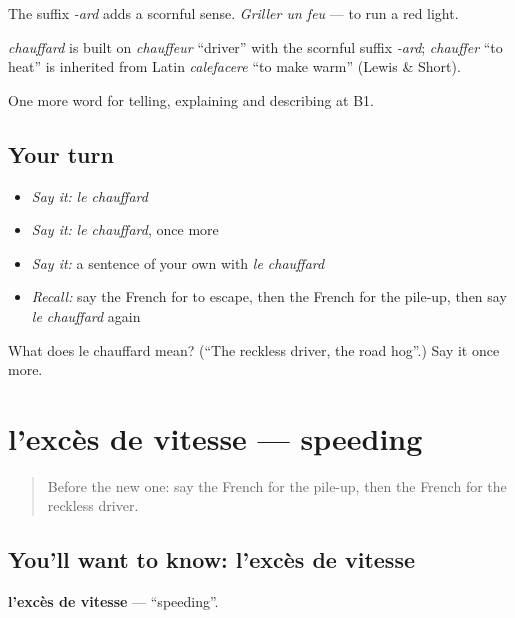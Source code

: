 The suffix \emph{-ard} adds a scornful sense. \emph{Griller un feu} — to run a red light.

\begin{cousinweb}
\emph{chauffard} is built on \emph{chauffeur} \textquotedblleft{}driver\textquotedblright{} with the scornful suffix \emph{-ard}; \emph{chauffer} \textquotedblleft{}to heat\textquotedblright{} is inherited from Latin \emph{calefacere} \textquotedblleft{}to make warm\textquotedblright{} (Lewis \& Short).
\end{cousinweb}

\begin{grammarlens}[title={What you've built}]
One more word for telling, explaining and describing at B1.
\end{grammarlens}

\subsection*{Your turn}
\begin{itemize}
\raggedright
  \item \emph{Say it:} \emph{le chauffard}
  \item \emph{Say it:} \emph{le chauffard}, once more
  \item \emph{Say it:} a sentence of your own with \emph{le chauffard}
  \item \emph{Recall:} say the French for to escape, then the French for the pile-up, then say \emph{le chauffard} again
\end{itemize}

\begin{tcolorbox}[breakable,colback=teal!4,colframe=teal!35!black,title={Before you move on}]
What does le chauffard mean? (\textquotedblleft{}The reckless driver, the road hog\textquotedblright{}.) Say it once more.
\end{tcolorbox}
\section[l'excès de vitesse]{l'excès de vitesse — speeding}

\label{lesson:FR-C297-exces-de-vitesse}



\begin{quote}
Before the new one: say the French for the pile-up, then the French for the reckless driver.
\end{quote}

\subsection*{You'll want to know: l'excès de vitesse}
\textbf{l'excès de vitesse} — \textquotedblleft{}speeding\textquotedblright{}.

